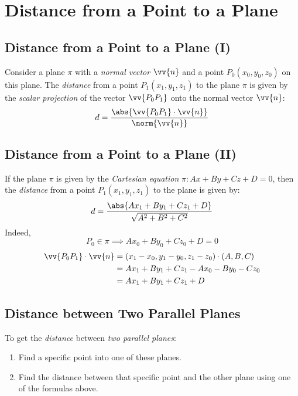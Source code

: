 \section{Distance from a Point to a Plane}
\subsection{Distance from a Point to a Plane (I)}
	Consider a plane $\pi$ with a \emph{normal vector} $\vv{n}$ and a point $P_0(x_0,y_0,z_0)$ on this plane. The \emph{distance} from a point $P_1(x_1,y_1,z_1)$ to the plane $\pi$ is given by the \emph{scalar projection} of the vector $\vv{P_0P_1}$ onto the normal vector $\vv{n}$:
	\begin{equation}\label{eq:9.6:scalarPointPlaneDist}
		d = \frac{\abs{\vv{P_0P_1} \cdot \vv{n}}}{\norm{\vv{n}}}
	\end{equation}
\subsection{Distance from a Point to a Plane (II)}
	If the plane $\pi$ is given by the \emph{Cartesian equation} $\pi: Ax + By + Cz + D = 0$, then the \emph{distance} from a point $P_1(x_1,y_1,z_1)$ to the plane is given by:
	\begin{equation}\label{eq:9.6:pointPlaneDist}
		d = \frac{\abs{Ax_1 + By_1 + Cz_1 + D}}{\sqrt{A^2 + B^2 + C^2}}
	\end{equation}
	Indeed,
	\[P_0 \in \pi \implies Ax_0 + By_0 + Cz_0 + D = 0\]
	\begin{align*}
		\vv{P_0P_1} \cdot \vv{n} &= (x_1 - x_0, y_1 - y_0, z_1 - z_0) \cdot (A, B, C)\\
		                         &= Ax_1 + By_1 + Cz_1 - Ax_0 - By_0 - Cz_0\\
					 &= Ax_1 + By_1 + Cz_1 + D
	\end{align*}
\subsection{Distance between Two Parallel Planes}
	To get the \emph{distance} between \emph{two parallel planes}:
	\begin{enumerate}
		\item Find a specific point into one of these planes.
		\item Find the distance between that specific point and the other plane using one of the formulas above.
	\end{enumerate}
